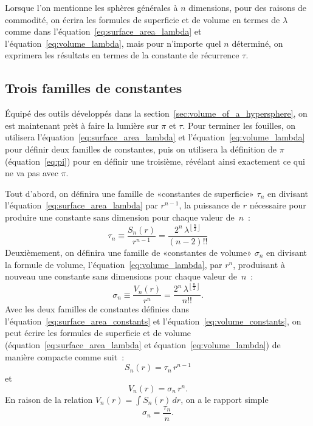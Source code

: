 Lorsque l'on mentionne les sphères générales à $n$ dimensions, pour des raisons de
commodité, on écrira les formules de superficie et de volume en termes de
$\lambda$ comme dans l'équation~\eqref{eq:surface_area_lambda} et
l'équation~\eqref{eq:volume_lambda}, mais pour n'importe quel $n$ déterminé, on
exprimera les résultats en termes de la constante de récurrence $\tau$.




  \subsection{Trois familles de constantes} %
  \label{sec:three_families_of_constants}

Équipé des outils développés dans la section~\ref{sec:volume_of_a_hypersphere},
on est maintenant prèt à faire la lumière sur $\pi$ et $\tau$. Pour terminer les fouilles, on
utilisera l'équation~\eqref{eq:surface_area_lambda} et
l'équation~\eqref{eq:volume_lambda} pour définir deux familles de constantes,
puis on utilisera la définition de $\pi$ (équation~\eqref{eq:pi}) pour en
définir une troisième, révélant ainsi exactement ce qui ne va pas avec $\pi$.

Tout d'abord, on définira une famille de «\ns constantes de superficie\ns » $\tau_n$
en divisant \linebreak l'équation~\eqref{eq:surface_area_lambda} par $r^{n-1}$,
la puissance de $r$ nécessaire pour produire une constante sans dimension pour
chaque valeur de~$n$~:
\begin{equation}
\label{eq:surface_area_constants}
\tau_n \equiv \frac{S_n(r)}{r^{n-1}} = \frac{2^n\,\lambda^{\left\lfloor \frac{n}{2} \right\rfloor}}{(n-2)!!}
\end{equation}
Deuxièmement, on définira une famille de «\ns constantes de volume\ns » $\sigma_n$
en divisant la formule de volume, l'équation~\eqref{eq:volume_lambda}, par
$r^n$, produisant à nouveau une constante sans dimensions pour chaque valeur
de~$n$~:
\begin{equation}
\label{eq:volume_constants}
\sigma_n \equiv \frac{V_n(r)}{r^n} = \frac{2^n\,\lambda^{\left\lfloor \frac{n}{2} \right\rfloor}}{n!!}.
\end{equation}
Avec les deux familles de constantes définies dans
l'équation~\eqref{eq:surface_area_constants} et
l'équation~\eqref{eq:volume_constants}, on peut écrire les formules de
superficie et de volume (équation~\eqref{eq:surface_area_lambda} et
équation~\eqref{eq:volume_lambda}) de manière compacte comme suit~:
\[ S_n(r) = \tau_n\,r^{n-1} \]
et
\[ V_n(r) = \sigma_n\,r^n. \]
En raison de la relation $V_n(r) = \int S_n(r)\,dr$, on a le rapport simple
\[
\sigma_n = \frac{\tau_n}{n}.
\]

